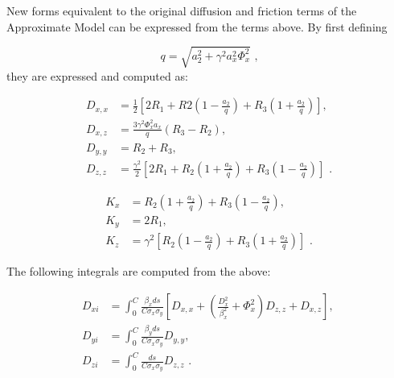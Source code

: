 New forms equivalent to the original diffusion and friction terms of the Approximate Model can be expressed from the terms above.
By first defining

\begin{equation}
    q = \sqrt{a_2^{2} + \gamma^2 a_x^{2} \Phi_x^2} \text{ ,}
\end{equation}
they are expressed and computed as:

\begin{equation}
    \begin{aligned}
        D_{x,x} &= \frac{1}{2} \left[ 2 R_1 + R2 \left(1 - \frac{a_2}{q}\right) + R_3 \left(1 + \frac{a_2}{q}\right) \right] \text{,  } \\
        D_{x,z} &= \frac{3 \gamma^2 \Phi_x^2 a_x}{q} \left(R_3 - R_2\right) \text{,  }  \\
        D_{y,y} &= R_2 + R_3 \text{,  }  \\
        D_{z,z} &= \frac{\gamma^2}{2} \left[ 2 R_1 +  R_2 \left(1 + \frac{a_2}{q}\right) + R_3 \left(1 - \frac{a_2}{q}\right) \right] \text{ .}
    \end{aligned}
    \label{equation:kinetic_AM_diffusion_terms}
\end{equation}

\begin{equation}
    \begin{aligned}
        K_x &= R_2 \left(1 + \frac{a_2}{q}\right) + R_3 \left(1 - \frac{a_2}{q}\right) \text{,  } \\
        K_y &= 2 R_1 \text{,  }  \\
        K_z &= \gamma^2 \left[ R_2 \left(1 - \frac{a_2}{q}\right) + R_3 \left(1 + \frac{a_2}{q}\right) \right] \text{ .}
    \end{aligned}
    \label{equation:kinetic_AM_friction_terms}
\end{equation}

The following integrals are computed from the above:

\begin{equation}
    \begin{aligned}
        D_{xi} &= \int_0^C \frac{\beta_x ds}{C \sigma_x \sigma_y} \left[D_{x,x} + \left(\frac{D_x^2}{\beta_x^2} + \Phi_x^2\right) D_{z,z} + D_{x,z} \right] \text{,  } \\
        D_{yi} &= \int_0^C \frac{\beta_y ds}{C \sigma_x \sigma_y} D_{y,y} \text{,  }  \\
        D_{zi} &= \int_0^C \frac{ds}{C \sigma_x \sigma_y} D_{z,z} \text{ .}
    \end{aligned}
    \label{equation:kinetic_diffusion_integrals}
\end{equation}

